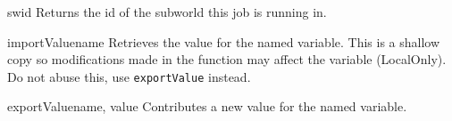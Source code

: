 \begin{memberdesc}[FunctionJob]{swid}
Returns the id of the subworld this job is running in.
\end{memberdesc}

\begin{methoddesc}[FunctionJob]{importValue}{name}
Retrieves the value for the named variable.
This is a shallow copy so modifications made in the function may affect the variable (LocalOnly). 
Do not abuse this, use \texttt{exportValue} instead.
\end{methoddesc}

\begin{methoddesc}[FunctionJob]{exportValue}{name, value}
Contributes a new value for the named variable.
\end{methoddesc}
